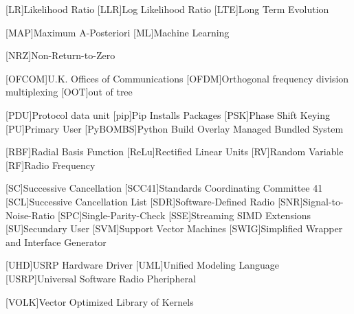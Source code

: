 \begin{acronym}[TROLL]
  [LR]{Likelihood Ratio}
  [LLR]{Log Likelihood Ratio}
  [LTE]{Long Term Evolution}

  [MAP]{Maximum A-Posteriori}
  [ML]{Machine Learning}

  [NRZ]{Non-Return-to-Zero}

  [OFCOM]{U.K. Offices of Communications}
  [OFDM]{Orthogonal frequency division multiplexing}
  [OOT]{out of tree}

  [PDU]{Protocol data unit}
  [pip]{Pip Installs Packages}
  [PSK]{Phase Shift Keying}
  [PU]{Primary User}
  [PyBOMBS]{Python Build Overlay Managed Bundled System}

  [RBF]{Radial Basis Function}
  [ReLu]{Rectified Linear Units}
  [RV]{Random Variable}
  [RF]{Radio Frequency}

  [SC]{Successive Cancellation}
  [SCC41]{Standards Coordinating Committee 41}
  [SCL]{Successive Cancellation List}
  [SDR]{Software-Defined Radio}
  [SNR]{Signal-to-Noise-Ratio}
  [SPC]{Single-Parity-Check}
  [SSE]{Streaming SIMD Extensions}
  [SU]{Secundary User}
  [SVM]{Support Vector Machines}
  [SWIG]{Simplified Wrapper and Interface Generator}

 [UHD]{\ac{USRP} Hardware Driver\texttrademark}
 [UML]{Unified Modeling Language}
 [USRP]{Universal Software Radio Pheripheral}

 [VOLK]{Vector Optimized Library of Kernels}
\end{acronym}
